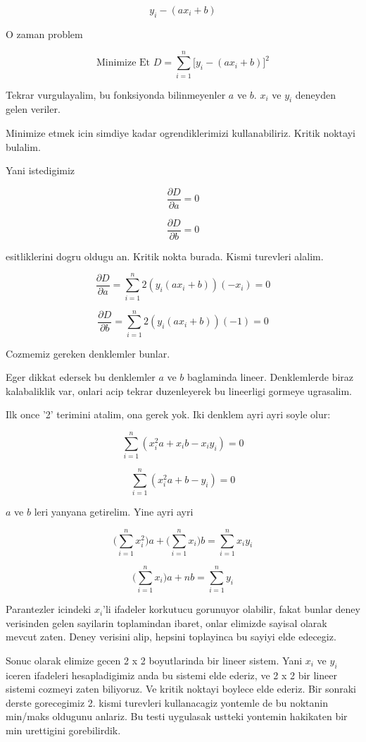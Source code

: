 \documentclass[12pt,fleqn]{article}
\begin{document}
\[ y_i - (ax_i + b) \]

O zaman problem

\[ \textrm{Minimize Et } D = \sum_{i=1}^n \bigg[ y_i - (ax_i+b) \bigg]^2 \]

Tekrar vurgulayalim, bu fonksiyonda bilinmeyenler $a$ ve $b$. $x_i$ ve
$y_i$ deneyden gelen veriler. 

Minimize etmek icin simdiye kadar ogrendiklerimizi kullanabiliriz. Kritik
noktayi bulalim. 

Yani istedigimiz 

\[ \frac{\partial D}{\partial a} =0 \]

\[ \frac{\partial D}{\partial b} =0 \]

esitliklerini dogru oldugu an. Kritik nokta burada. Kismi turevleri alalim.

\[ \frac{\partial D}{\partial a}  =
\sum_{i=1}^n 2 (y_i (ax_i+b)) (-x_i) 
= 0
 \]

\[ \frac{\partial D}{\partial b} = 
\sum_{i=1}^n 2 (y_i (ax_i+b)) (-1) 
=0 \]

Cozmemiz gereken denklemler bunlar. 

Eger dikkat edersek bu denklemler $a$ ve $b$ baglaminda
lineer. Denklemlerde biraz kalabaliklik var, onlari acip tekrar
duzenleyerek bu lineerligi gormeye ugrasalim. 

Ilk once '2' terimini atalim, ona gerek yok. Iki denklem ayri ayri soyle
olur:

\[ \sum_{i=1}^n (x_i^2a + x_ib - x_iy_i) = 0\]

\[ \sum_{i=1}^n (x_i^2a + b - y_i) = 0\]

$a$ ve $b$ leri yanyana getirelim. Yine ayri ayri

\[  \bigg(\sum_{i=1}^n x_i^2\bigg)a + \bigg(\sum_{i=1}^n x_i\bigg) b = \sum_{i=1}^n x_iy_i\]

\[  \bigg(\sum_{i=1}^n x_i\bigg)a + nb = \sum_{i=1}^n y_i \]

Parantezler icindeki $x_i$'li ifadeler korkutucu gorunuyor olabilir, fakat
bunlar deney verisinden gelen sayilarin toplamindan ibaret, onlar elimizde
sayisal olarak mevcut zaten. Deney verisini alip, hepsini toplayinca bu
sayiyi elde edecegiz. 

Sonuc olarak elimize gecen 2 x 2 boyutlarinda bir lineer sistem. Yani $x_i$
ve $y_i$ iceren ifadeleri hesapladigimiz anda bu sistemi elde ederiz, ve 2
x 2 bir lineer sistemi cozmeyi zaten biliyoruz. Ve kritik noktayi boylece
elde ederiz. Bir sonraki derste gorecegimiz 2. kismi turevleri kullanacagiz
yontemle de bu noktanin min/maks oldugunu anlariz. Bu testi uygulasak
ustteki yontemin hakikaten bir min urettigini gorebilirdik. 
\end{document}

